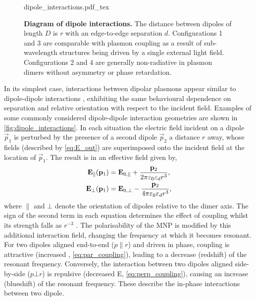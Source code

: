 \documentclass{article}
\begin{document}
\begin{figure}[bt]
\fontsize{10pt}{1em}\selectfont
\def\svgwidth{0.7\textwidth}
{dipole_interactions.pdf_tex}
\caption[Diagram of dipole interactions]{\textbf{Diagram of dipole interactions.} The distance between dipoles of length $D$ is $r$ with an edge-to-edge separation $d$. Configurations 1 and 3 are comparable with plasmon coupling as a result of sub-wavelength structures being driven by a single external light field. Configurations 2 and 4 are generally non-radiative in plasmon dimers without asymmetry or phase retardation.}
\label{fig:dipole_interactions}
\end{figure}

In its simplest case, interactions between dipolar plasmons appear similar to dipole-dipole interactions \cite{kreibig1995optical, maier2002, gluodenis2002, rechberger2003, atay2004}, exhibiting the same behavioural dependence on separation and relative orientation with respect to the incident field. Examples of some commonly considered dipole-dipole interaction geometries are shown in \autoref{fig:dipole_interactions}. In each situation the electric field incident on a dipole $\vec{p}_1$ is perturbed by the presence of a second dipole $\vec{p}_2$ a distance $r$ away, whose fields (described by \eqref{eq:E_out}) are superimposed onto the incident field at the location of $\vec{p}_1$. The result is in an effective field given by,
\begin{subequations}
\begin{align}
	\mathbf{E}_{\parallel}(\mathbf{p}_1) &= \mathbf{E}_{0,\parallel} + \frac{\mathbf{p}_2}{2\pi\varepsilon_0\varepsilon_d r^3}, \label{eq:par_coupling} \\
	\mathbf{E}_{\bot}(\mathbf{p}_1) &= \mathbf{E}_{0,\bot} - \frac{\mathbf{p}_2}{4\pi\varepsilon_0\varepsilon_d r^3}, \label{eq:perp_coupling}
\end{align}
\end{subequations}
where $\parallel$ and $\bot$ denote the orientation of dipoles relative to the dimer axis. The sign of the second term in each equation determines the effect of coupling whilst its strength falls as $r^{-3}$ \cite{halas2011}. The polarisability of the MNP is modified by this additional interaction field, changing the frequency at which it becomes resonant.
For two dipoles aligned end-to-end ($p \parallel r$) and driven in phase, coupling is attractive (increased , \eqref{eq:par_coupling}), leading to a decrease (redshift) of the resonant frequency. Conversely, the interaction between two dipoles aligned side-by-side ($p \bot r$) is repulsive (decreased E, \eqref{eq:perp_coupling}), causing an increase (blueshift) of the resonant frequency. These describe the in-phase interactions between two dipole.
\end{document}
